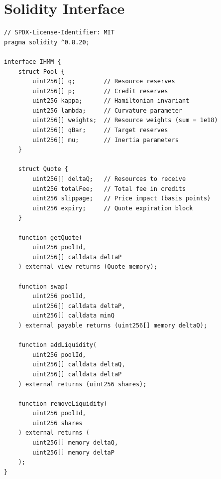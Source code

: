 \section{Solidity Interface}

\label{app:solidity}

\begin{verbatim}
// SPDX-License-Identifier: MIT
pragma solidity ^0.8.20;

interface IHMM {
    struct Pool {
        uint256[] q;        // Resource reserves
        uint256[] p;        // Credit reserves
        uint256 kappa;      // Hamiltonian invariant
        uint256 lambda;     // Curvature parameter
        uint256[] weights;  // Resource weights (sum = 1e18)
        uint256[] qBar;     // Target reserves
        uint256[] mu;       // Inertia parameters
    }

    struct Quote {
        uint256[] deltaQ;   // Resources to receive
        uint256 totalFee;   // Total fee in credits
        uint256 slippage;   // Price impact (basis points)
        uint256 expiry;     // Quote expiration block
    }

    function getQuote(
        uint256 poolId,
        uint256[] calldata deltaP
    ) external view returns (Quote memory);

    function swap(
        uint256 poolId,
        uint256[] calldata deltaP,
        uint256[] calldata minQ
    ) external payable returns (uint256[] memory deltaQ);

    function addLiquidity(
        uint256 poolId,
        uint256[] calldata deltaQ,
        uint256[] calldata deltaP
    ) external returns (uint256 shares);

    function removeLiquidity(
        uint256 poolId,
        uint256 shares
    ) external returns (
        uint256[] memory deltaQ,
        uint256[] memory deltaP
    );
}
\end{verbatim}

